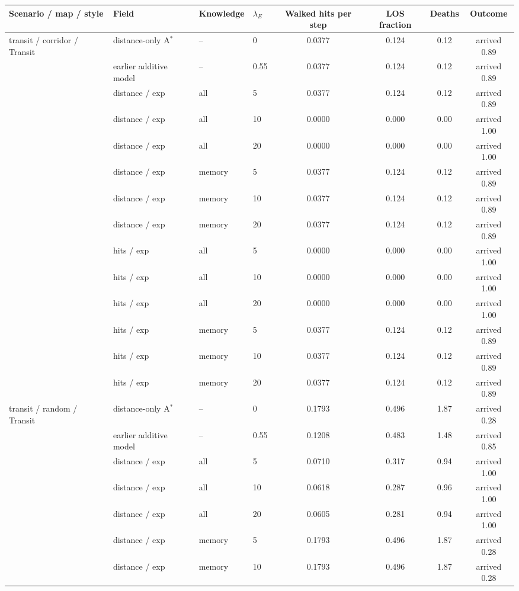 \begin{tabular}{llllcccc}
\toprule
Scenario / map / style & Field & Knowledge & $\lambda_E$ & Walked hits per step & LOS fraction & Deaths & Outcome \\
\midrule
transit / corridor / Transit & distance-only A$^*$ & -- & 0 & 0.0377 & 0.124 & 0.12 & arrived 0.89 \\
 & earlier additive model & -- & 0.55 & 0.0377 & 0.124 & 0.12 & arrived 0.89 \\
 & distance / exp & all & 5 & 0.0377 & 0.124 & 0.12 & arrived 0.89 \\
 & distance / exp & all & 10 & 0.0000 & 0.000 & 0.00 & arrived 1.00 \\
 & distance / exp & all & 20 & 0.0000 & 0.000 & 0.00 & arrived 1.00 \\
 & distance / exp & memory & 5 & 0.0377 & 0.124 & 0.12 & arrived 0.89 \\
 & distance / exp & memory & 10 & 0.0377 & 0.124 & 0.12 & arrived 0.89 \\
 & distance / exp & memory & 20 & 0.0377 & 0.124 & 0.12 & arrived 0.89 \\
 & hits / exp & all & 5 & 0.0000 & 0.000 & 0.00 & arrived 1.00 \\
 & hits / exp & all & 10 & 0.0000 & 0.000 & 0.00 & arrived 1.00 \\
 & hits / exp & all & 20 & 0.0000 & 0.000 & 0.00 & arrived 1.00 \\
 & hits / exp & memory & 5 & 0.0377 & 0.124 & 0.12 & arrived 0.89 \\
 & hits / exp & memory & 10 & 0.0377 & 0.124 & 0.12 & arrived 0.89 \\
 & hits / exp & memory & 20 & 0.0377 & 0.124 & 0.12 & arrived 0.89 \\
\midrule
transit / random / Transit & distance-only A$^*$ & -- & 0 & 0.1793 & 0.496 & 1.87 & arrived 0.28 \\
 & earlier additive model & -- & 0.55 & 0.1208 & 0.483 & 1.48 & arrived 0.85 \\
 & distance / exp & all & 5 & 0.0710 & 0.317 & 0.94 & arrived 1.00 \\
 & distance / exp & all & 10 & 0.0618 & 0.287 & 0.96 & arrived 1.00 \\
 & distance / exp & all & 20 & 0.0605 & 0.281 & 0.94 & arrived 1.00 \\
 & distance / exp & memory & 5 & 0.1793 & 0.496 & 1.87 & arrived 0.28 \\
 & distance / exp & memory & 10 & 0.1793 & 0.496 & 1.87 & arrived 0.28 \\

\end{tabular}
